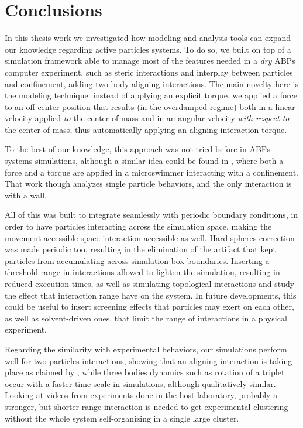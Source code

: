 \documentclass[../../master_thesis_np.tex]{subfiles}
\begin{document}
\chapter{Conclusions}

In this thesis work we investigated how modeling and analysis tools can expand our knowledge regarding active particles systems.
To do so, we built on top of a simulation framework able to manage most of the features needed in a \emph{dry} ABPs computer experiment, such as steric interactions and interplay between particles and confinement, adding two-body aligning interactions.
The main novelty here is the modeling technique: instead of applying an explicit torque, we applied a force to an off-center position that results (in the overdamped regime) both in a linear velocity applied \emph{to} the center of mass and in an angular velocity \emph{with respect to} the center of mass, thus automatically applying an aligning interaction torque.

{\color{blue} To the best of our knowledge, this approach was not tried before in ABPs systems simulations, although a similar idea could be found in \cite{ostapenko_curvature-guided_2018}, where both a force and a torque are applied in a microswimmer interacting with a confinement.
That work though analyzes single particle behaviors, and the only interaction is with a wall.}

All of this was built to integrate seamlessly with periodic boundary conditions, in order to have particles interacting across the simulation space, making the movement-accessible space interaction-accessible as well.
Hard-spheres correction was made periodic too, resulting in the elimination of the artifact that kept particles from accumulating across simulation box boundaries.
Inserting a threshold range in interactions allowed to lighten the simulation, resulting in reduced execution times, as well as simulating topological interactions and study the effect that interaction range have on the system.
In future developments, this could be useful to insert screening effects that particles may exert on each other, as well as solvent-driven ones, that limit the range of interactions in a physical experiment.

Regarding the similarity with experimental behaviors, our simulations perform well for two-particles interactions, showing that an aligning interaction is taking place as claimed by \cite{singh_pair_2024}, while three bodies dynamics such as rotation of a triplet occur with a faster time scale in simulations, although qualitatively similar.
Looking at videos from experiments done in the host laboratory, probably a stronger, but shorter range interaction is needed to get experimental clustering without the whole system self-organizing in a single large cluster.
\end{document}
